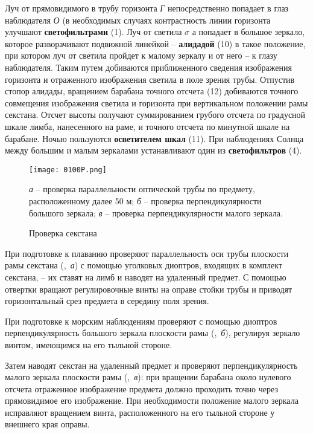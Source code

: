 Луч от прямовидимого в трубу горизонта \textit{Г} непосредственно
попадает в глаз наблюдателя \textit{О} (в необходимых случаях
контрастность линии горизонта улучшают \textbf{светофильтрами}
(1). Луч от светила $\sigma$ а попадает в большое зеркало, которое
разворачивают подвижной линейкой \--- \textbf{алидадой} (10) в такое
положение, при котором луч от светила пройдет к малому зеркалу и от
него \--- к глазу наблюдателя. Таким путем добиваются приближенного
сведения изображения горизонта и отраженного изображения светила в
поле зрения трубы. Отпустив стопор алидады, вращением барабана точного
отсчета (12) добиваются точного совмещения изображения светила и
горизонта при вертикальном положении рамы секстана. Отсчет высоты
получают суммированием грубого отсчета по градусной шкале лимба,
нанесенного на раме, и точного отсчета по минутной шкале на
барабане. Ночью пользуются \textbf{осветителем шкал} (11). При
наблюдениях Солнца между большим и малым зеркалами устанавливают один
из \textbf{светофильтров} (4).

\begin{figure}[!htb]
  \centering
  \texttt{[image: 0100P.png]}
  \caption{Проверка секстана}
  \label{fig:100}
  \small
  \textit{а} \--- проверка параллельности оптической трубы по предмету, расположенному далее 50 м;
  \textit{б} \--- проверка перпендикулярности большого зеркала;
  \textit{в} \--- проверка перпендикулярности малого зеркала.

\end{figure}

При подготовке к плаванию проверяют параллельность оси трубы плоскости
рамы секстана (,~\textit{а}) с помощью уголковых диоптров,
входящих в комплект секстана, \--- их ставят на лимб и наводят на
удаленный предмет. С помощью отвертки вращают регулировочные винты на
оправе стойки трубы и приводят горизонтальный срез предмета в середину
поля зрения.

При подготовке к морским наблюдениям проверяют с помощью диоптров
перпендикулярность большого зеркала плоскости рамы (,~\textit{б}),
регулируя зеркало винтом, имеющимся на его тыльной стороне.

Затем наводят секстан на удаленный предмет и проверяют
перпендикулярность малого зеркала плоскости рамы (,~\textit{в}): при
вращении барабана около нулевого отсчета отраженное изображение
предмета должно проходить точно через прямовидимое его
изображение. При необходимости положение малого зеркала исправляют
вращением винта, расположенного на его тыльной стороне у внешнего края
оправы.

